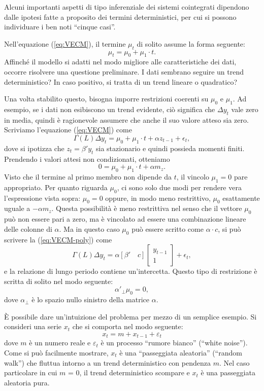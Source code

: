 Alcuni importanti aspetti di tipo inferenziale dei sistemi cointegrati dipendono
dalle ipotesi fatte a proposito dei termini deterministici, per cui si possono
individuare i ben noti ``cinque casi''.

Nell'equazione (\ref{eq:VECM}), il termine $\mu_t$ di solito assume la forma
seguente:
\[
  \mu_t = \mu_0 + \mu_1 \cdot t .
\]
Affinché il modello si adatti nel modo migliore alle caratteristiche dei dati,
occorre risolvere una questione preliminare. I dati sembrano seguire un trend
deterministico? In caso positivo, si tratta di un trend lineare o quadratico?

Una volta stabilito questo, bisogna imporre restrizioni coerenti su $\mu_0$
e $\mu_1$. Ad esempio, se i dati non esibiscono un trend evidente, ciò
significa che $\Delta y_t$ vale zero in media, quindi è ragionevole assumere
che anche il suo valore atteso sia zero. Scriviamo l'equazione
(\ref{eq:VECM}) come
\begin{equation}
  \label{eq:VECM-poly}
  \Gamma(L) \Delta y_t = \mu_0 + \mu_1 \cdot t + \alpha z_{t-1} +
  \epsilon_t ,
\end{equation}
dove si ipotizza che $z_{t} = \beta' y_{t}$ sia stazionario e quindi possieda
momenti finiti. Prendendo i valori attesi non condizionati, otteniamo
\[ 
  0 = \mu_0 + \mu_1 \cdot t + \alpha m_z .
\]
Visto che il termine al primo membro non dipende da $t$, il vincolo
$\mu_1 = 0$ pare appropriato. Per quanto riguarda $\mu_0$, ci sono solo due
modi per rendere vera l'espressione vista sopra: $\mu_0 = 0$ oppure, in modo
meno restrittivo, $\mu_0$ esattamente uguale a $-\alpha m_z$. Questa possibilità
è meno restrittiva nel senso che il vettore $\mu_0$ può non essere pari a zero,
ma è vincolato ad essere una combinazione lineare delle colonne di
$\alpha$. Ma in questo caso $\mu_0$ può essere scritto come
$\alpha \cdot c$, si può scrivere la (\ref{eq:VECM-poly}) come
\[
  \Gamma(L) \Delta y_t = \alpha \left[ \beta' \quad c \right] 
  \left[ \begin{array}{c} y_{t-1} \\ 1 \end{array} \right]  
  + \epsilon_t ,
\]
e la relazione di lungo periodo contiene un'intercetta. Questo tipo
di restrizione è scritta di solito nel modo seguente:
\[
  \alpha'_{\perp} \mu_0 = 0 ,
\]
dove $\alpha_{\perp}$ è lo spazio nullo sinistro della matrice $\alpha$.

È possibile dare un'intuizione del problema per mezzo di un semplice esempio.
Si consideri una serie $x_t$ che si comporta nel modo seguente:
%      
\[ x_t = m + x_{t-1} + \varepsilon_t \] 
%
dove $m$ è un numero reale e $\varepsilon_t$ è un processo ``rumore bianco''
(``white noise''). Come si può facilmente mostrare, $x_t$ è una ``passeggiata aleatoria''
(``random walk'') che fluttua intorno a un trend deterministico con pendenza $m$. Nel
caso particolare in cui $m$ = 0, il trend deterministico scompare e
$x_t$ è una passeggiata aleatoria pura.
    
